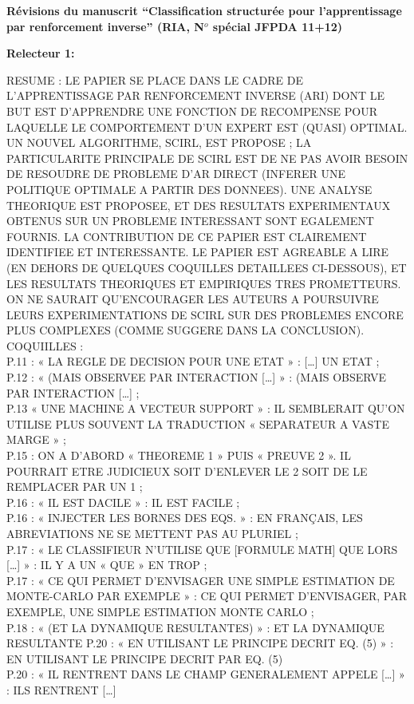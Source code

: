 \documentclass[11pt, a4paper]{letter}
\begin{document}
\begin{letter}{\large \textbf{Révisions du manuscrit ``Classification structurée pour l'apprentissage par renforcement inverse'' (RIA, N$^o$ spécial JFPDA 11+12)}}
\newpage
\color{black}
\begin{large} \textbf{Relecteur 1:} \\ \end{large}
RESUME : LE PAPIER SE PLACE DANS LE CADRE DE L’APPRENTISSAGE PAR RENFORCEMENT INVERSE (ARI)
DONT LE BUT EST D’APPRENDRE UNE FONCTION DE RECOMPENSE POUR LAQUELLE LE COMPORTEMENT D’UN
EXPERT EST (QUASI) OPTIMAL. UN NOUVEL ALGORITHME, SCIRL, EST PROPOSE ; LA PARTICULARITE
PRINCIPALE DE SCIRL EST DE NE PAS AVOIR BESOIN DE RESOUDRE DE PROBLEME D’AR DIRECT (INFERER
UNE POLITIQUE OPTIMALE A PARTIR DES DONNEES). UNE ANALYSE THEORIQUE EST PROPOSEE, ET DES
RESULTATS EXPERIMENTAUX OBTENUS SUR UN PROBLEME INTERESSANT SONT EGALEMENT FOURNIS.
LA CONTRIBUTION DE CE PAPIER EST CLAIREMENT IDENTIFIEE ET INTERESSANTE. LE PAPIER EST AGREABLE
A LIRE (EN DEHORS DE QUELQUES COQUILLES DETAILLEES CI-DESSOUS), ET LES RESULTATS THEORIQUES ET
EMPIRIQUES TRES PROMETTEURS. ON NE SAURAIT QU’ENCOURAGER LES AUTEURS A POURSUIVRE LEURS
EXPERIMENTATIONS DE SCIRL SUR DES PROBLEMES ENCORE PLUS COMPLEXES (COMME SUGGERE DANS LA
CONCLUSION).
COQUIILLES :\\
P.11 : « LA REGLE DE DECISION POUR UNE ETAT » : […] UN ETAT ;\\
P.12 : « (MAIS OBSERVEE PAR INTERACTION […] » : (MAIS OBSERVE PAR INTERACTION […] ;\\
P.13 « UNE MACHINE A VECTEUR SUPPORT » : IL SEMBLERAIT QU’ON UTILISE PLUS SOUVENT LA TRADUCTION
« SEPARATEUR A VASTE MARGE » ;\\
P.15 : ON A D’ABORD « THEOREME 1 » PUIS « PREUVE 2 ». IL POURRAIT ETRE JUDICIEUX SOIT D’ENLEVER
LE 2 SOIT DE LE REMPLACER PAR UN 1 ;\\
P.16 : « IL EST DACILE » : IL EST FACILE ;\\
P.16 : « INJECTER LES BORNES DES EQS. » : EN FRANÇAIS, LES ABREVIATIONS NE SE METTENT PAS AU
PLURIEL ;\\
P.17 : « LE CLASSIFIEUR N’UTILISE QUE [FORMULE MATH] QUE LORS […] » : IL Y A UN « QUE » EN TROP ;\\
P.17 : « CE QUI PERMET D’ENVISAGER UNE SIMPLE ESTIMATION DE MONTE-CARLO PAR EXEMPLE » : CE QUI
PERMET D’ENVISAGER, PAR EXEMPLE, UNE SIMPLE ESTIMATION MONTE CARLO ;\\
P.18 : « (ET LA DYNAMIQUE RESULTANTES) » : ET LA DYNAMIQUE RESULTANTE
P.20 : « EN UTILISANT LE PRINCIPE DECRIT EQ. (5) » : EN UTILISANT LE PRINCIPE DECRIT PAR EQ. (5)\\
P.20 : « IL RENTRENT DANS LE CHAMP GENERALEMENT APPELE […] » : ILS RENTRENT […]\\

\end{letter}
\end{document}
